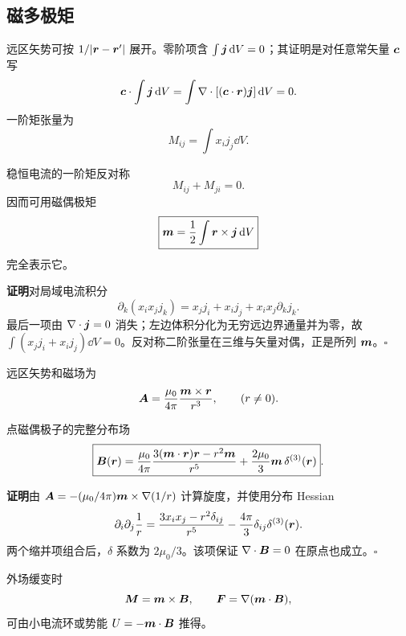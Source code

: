 \subsection{磁多极矩}

远区矢势可按
$1/|\bm{r}-\bm{r}'|$ 展开。零阶项含
$\int\bm{j}\mathop{}\!\mathrm d V=0$；其证明是对任意常矢量 $\bm{c}$ 写
\[
 \bm{c}\cdot\int\bm{j}\mathop{}\!\mathrm d V
 =\int\nabla\cdot[(\bm{c}\cdot\bm{r})\bm{j}]\mathop{}\!\mathrm d V=0.
\]
一阶矩张量为
\[
 M_{ij}=\int x_i j_j\dd V.
\]

\begin{advtheorem}{稳恒电流的一阶矩反对称}\label{advA4:thm:moment-antisymmetric}
\[
 \boxed{M_{ij}+M_{ji}=0}.
\]
因而可用磁偶极矩
\[
 \boxed{\bm{m}=\frac12\int\bm{r}\times\bm{j}\mathop{}\!\mathrm d V}
\]
完全表示它。
\end{advtheorem}
\noindent\textbf{证明}\quad 对局域电流积分
\[
 \partial_k(x_ix_jj_k)=x_jj_i+x_ij_j+x_ix_j\partial_kj_k.
\]
最后一项由 $\nabla\cdot\bm{j}=0$ 消失；左边体积分化为无穷远边界通量并为零，故
$\int(x_jj_i+x_ij_j)\dd V=0$。反对称二阶张量在三维与矢量对偶，正是所列 $\bm{m}$。\hfill$\square$

远区矢势和磁场为
\[
 \bm{A}=\frac{\mu_0}{4\pi}\frac{\bm{m}\times\bm{r}}{r^3},
 \qquad (r\ne0).
\]

\begin{advtheorem}{点磁偶极子的完整分布场}\label{advA4:thm:magnetic-dipole-field}
\[
 \boxed{\bm{B}(\bm{r})=\frac{\mu_0}{4\pi}
 \frac{3(\bm{m}\cdot\bm{r})\bm{r}-r^2\bm{m}}{r^5}
 +\frac{2\mu_0}{3}\bm{m}\,\delta^{(3)}(\bm{r})}.
\]
\end{advtheorem}
\noindent\textbf{证明}\quad 由
$\bm{A}=-(\mu_0/4\pi)\bm{m}\times\nabla(1/r)$ 计算旋度，并使用分布 Hessian
\[
 \partial_i\partial_j\frac1r
 =\frac{3x_ix_j-r^2\delta_{ij}}{r^5}
 -\frac{4\pi}{3}\delta_{ij}\delta^{(3)}(\bm{r}).
\]
两个缩并项组合后，$\delta$ 系数为 $2\mu_0/3$。该项保证
$\nabla\cdot\bm{B}=0$ 在原点也成立。\hfill$\square$

外场缓变时
\[
 \bm{M}=\bm{m}\times\bm{B},
 \qquad \bm{F}=\nabla(\bm{m}\cdot\bm{B}),
\]
可由小电流环或势能 $U=-\bm{m}\cdot\bm{B}$ 推得。

